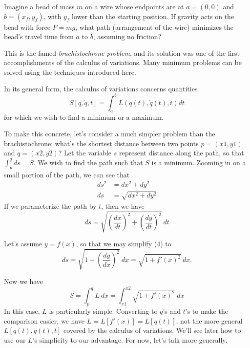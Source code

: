 \documentclass{article}
\newcommand{\mvar}{t}
\begin{document}
Imagine a bead of mass $m$ on a wire whose endpoints are at $a = (0,0)$ and $b = (x_f, y_f)$, with $y_f$ lower than the starting position.  If gravity acts on the bead with force $F = m g$, what path (arrangement of the wire) minimizes the bead's travel time from $a$ to $b$, assuming no friction?

This is the famed \emph{brachistochrone problem}, and its solution was one of the first accomplishments of the calculus of variations.  Many minimum problems can be solved using the techniques introduced here. 

In its general form, the calculus of variations concerns quantities
\begin{equation}
S[q,\dot{q}, \mvar] = \int_{a}^{b} L(q(\mvar),\dot{q}(\mvar), \mvar) d\mvar
\end{equation}
for which we wish to find a minimum or a maximum.

To make this concrete, let's consider a much simpler problem than the brachistochrone: what's the shortest distance between two points $p = (x1,y1)$ and $q = (x2,y2)$?  Let the variable $s$ represent distance along the path, so that $\int_{p}^{q} ds = S$.  We wish to find the path such that $S$ is a minimum.  Zooming in on a small portion of the path, we can see that
\begin{align}
ds^2 &= dx^2 + dy^2\\
ds &= \sqrt{dx^2 + dy^2}
\end{align}
If we parameterize the path by $t$, then we have
\begin{equation}
ds = \sqrt{\left(\frac{dx}{dt}\right)^2 + \left(\frac{dy}{dt}\right)^2}\ dt
\end{equation}

Let's assume $y = f(x)$, so that we may simplify (4) to
\begin{equation}
ds = \sqrt{1 + \left(\frac{dy}{dx}\right)^2}\ dx = \sqrt{1 + f'(x)^2}\ dx.
\end{equation}

Now we have
\begin{equation}
S = \int_{p}^{q} L\ dx = \int_{x1}^{x2} \sqrt{1 + f'(x)^2}\ dx
\end{equation}
In this case, $L$ is particularly simple.  Converting to $q$'s and $t$'s to make the comparison easier, we have $L = L[f'(x)] = L[\dot{q}(t)]$, not the more general $L[q(t), \dot{q}(t), t]$ covered by the calculus of variations.  We'll see later how to use our $L$'s simplicity to our advantage.  For now, let's talk more generally.
\end{document}
